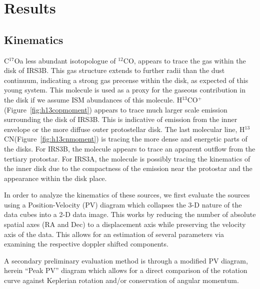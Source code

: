\documentclass[preprint,12pt]{aastex62}
\newcommand{\htcn}{H$^{13}$CN}
\newcommand{\cso}{C$^{17}$O}
\newcommand{\htcop}{H$^{13}$CO$^+$}
\newcommand{\co}{$^{12}$CO}
\begin{document}
\section{Results}\label{sec:results}

\subsection{Kinematics}
\cso\space a less abundant isotopologue of \co, appears to trace the gas within the disk of IRS3B. This gas structure extends to further radii than the dust continuum, indicating a strong gas precense within the disk, as expected of this young system. This molecule is used as a proxy for the gaseous contribution in the disk if we assume ISM abundances of this molecule. \htcop\space (Figure~\ref{fig:h13copmoment}) appears to trace much larger scale emission surrounding the disk of IRS3B. This is indicative of emission from the inner envelope or the more diffuse outer protostellar disk. The last molecular line, \htcn\space (Figure~\ref{fig:h13cnmoment}) is tracing the more dense and energetic parts of the disks. For IRS3B, the molecule appears to trace an apparent outflow from the tertiary protostar. For IRS3A, the molecule is possibly tracing the kinematics of the inner disk due to the compactness of the emission near the protostar and the appearance within the disk place.

In order to analyze the kinematics of these sources, we first evaluate the sources using a Position-Velocity (PV) diagram which collapses the 3-D nature of the data cubes into a 2-D data image. This works by reducing the number of absolute spatial axes (RA and Dec) to a displacement axis while preserving the velocity axis of the data. This allows for an estimation of several parameters via examining the respective doppler shifted components. 

A secondary preliminary evaluation method is through a modified PV diagram, herein ``Peak PV'' diagram \citep{2018ApJ...856..164T} which allows for a direct comparison of the rotation curve against Keplerian rotation and/or conservation of angular momentum.

\end{document}
